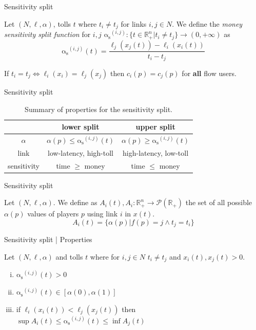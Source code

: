 \documentclass{beamer}
\newcommand{\as}{\mathrm{\alpha_s}}
\newcommand{\R}{\mathbb{R}}
\begin{document}
\begin{frame}{Sensitivity split}
	\begin{definition}
		Let $(N, \ell, \alpha)$, tolls $t$ where $t_i \ne t_j$ for links $i, j \in N$.
		We define the \textit{money sensitivity split function} for $i, j$ $\as^{(i, j)}: \{t \in \R_+^n|t_i \ne t_j\} \rightarrow (0, +\infty)$ as
		\[\as^{(i, j)}(t) = \frac{\ell_j(x_j(t)) - \ell_i(x_i(t))}{t_i - t_j}\]
	\end{definition}
	If $t_i = t_j \Leftrightarrow \ell_i(x_i) = \ell_j(x_j)$ then $c_i(p) = c_j(p)$ for \textbf{all} flow users.
\end{frame}

\begin{frame}{Sensitivity split}
	\begin{table}[h!]
		\centering
		\caption{Summary of properties for the sensitivity split.}
		\begin{tabular}{| c || c | c |}
			\hline
			& \textbf{lower split} & \textbf{upper split} \\ \hline
			$\alpha$ & $\alpha(p) \le \as^{(i, j)}(t)$ & $\alpha(p) \ge \as^{(i, j)}(t)$ \\ \hline
			link & low-latency, high-toll & high-latency, low-toll \\ \hline
			sensitivity & time $\ge$ money & time $\le$ money \\ \hline
		\end{tabular}
		\label{table:split_summary}
	\end{table}
\end{frame}

\begin{frame}{Sensitivity split}
	\begin{definition}
		Let $(N, \ell, \alpha)$.
		We define as $A_i(t), A_i: \R_+^n \rightarrow \mathcal{P}(\R_+)$ the set of all possible $\alpha(p)$ values of players $p$ using link $i$ in $x(t)$.
		\[A_i(t) = \{\alpha(p) | f(p) = j \wedge t_j = t_i\}\]
	\end{definition}
\end{frame}

\begin{frame}{Sensitivity split | Properties}
	\begin{lemma}
		Let $(N, \ell, \alpha)$ and tolls $t$ where for $i, j \in N$ $t_i \ne t_j$ and $x_i(t), x_j(t) > 0$.
		\begin{enumerate}[(i)]
			\item $\as^{(i, j)}(t) > 0$
			\item $\as^{(i, j)}(t) \in [\alpha(0), \alpha(1)]$
			\item if $\ell_i(x_i(t)) < \ell_j(x_j(t))$ then
			$\sup A_i(t) \le \as^{(i, j)}(t) \le \inf A_j(t)$
		\end{enumerate}
	\end{lemma}
\end{frame}
\end{document}
